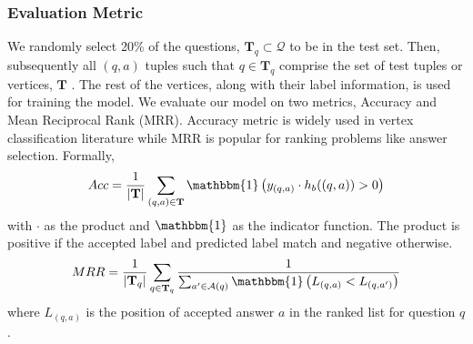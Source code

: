 \subsubsection{Evaluation Metric}
We randomly select 20\% of the questions, $\mathbf{T}_q \subset \mathcal{Q}$ to be in the test set. Then, subsequently all $(q,a)$ tuples such that $q \in \mathbf{T}_q$ comprise the set of test tuples or vertices, $\mathbf{T}$ . The rest of the vertices, along with their label information, is used for training the model.
We evaluate our model on two metrics, Accuracy and Mean Reciprocal Rank (MRR). Accuracy metric is widely used in vertex classification literature while MRR is popular for ranking problems like answer selection. Formally,
\begin{align*}
Acc = \frac{1}{\vert \mathbf{T} \vert} \sum_{(q,a) \in  \mathbf{T} } \mathbbm{1} \left(  y_{(q,a)} \cdot h_b((q,a)) > 0 \right)
\end{align*}
with $\cdot$ as the product and $\mathbbm{1}$ as the indicator function. The product is positive if the accepted label and predicted label match and negative otherwise.
\begin{equation*}
MRR = \frac{1}{\vert \mathbf{T}_q \vert} \sum_{q \in \mathbf{T}_q} \frac{1}{\sum_{a' \in \mathcal{A}(q)}  \mathbbm{1} \left(L_{(q,a)} < L_{(q,a')} \right)} %
\end{equation*}
 where
$L_{(q,a)}$ is the position of accepted answer $a$ in the ranked list for question $q$ \cite{Wang:2009}.


